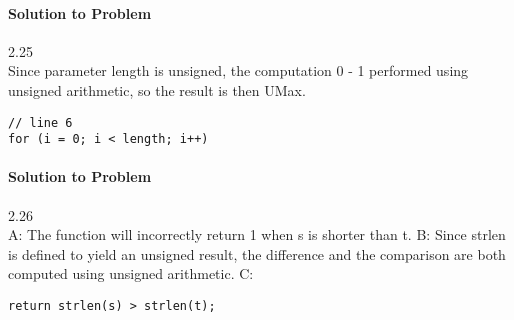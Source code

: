 \documentclass{report}
\begin{document}
\paragraph{Solution to Problem} 2.25 \\
Since parameter length is unsigned, the computation 0 - 1 performed using unsigned arithmetic, so the result is then UMax.
\begin{lstlisting}
// line 6  
for (i = 0; i < length; i++)
\end{lstlisting}

\paragraph{Solution to Problem} 2.26 \\
A: The function will incorrectly return 1 when s is shorter than t.
B: Since strlen is defined to yield an unsigned result, the difference and the comparison are both computed using unsigned arithmetic.
C:
\begin{lstlisting}
return strlen(s) > strlen(t);
\end{lstlisting}
\end{document}

